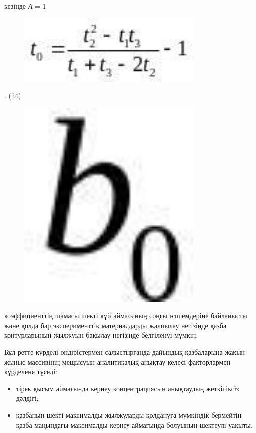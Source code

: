 кезінде \emph{А} = 1 \begin{figure}[H]
	\centering
	\includegraphics[width=0.8\textwidth]{assets/1310}
	\caption*{}
\end{figure}. (14)

\begin{figure}[H]
	\centering
	\includegraphics[width=0.8\textwidth]{assets/1304}
	\caption*{}
\end{figure} коэффициенттің шамасы шекті күй
аймағының соңғы өлшемдеріне байланысты және қолда бар эксперименттік
материалдарды жалпылау негізінде қазба контурларының жылжуын бақылау
негізінде белгіленуі мүмкін.

Бұл ретте күрделі өндірістермен салыстырғанда дайындық қазбаларына жақын
жыныс массивінің мещысуын аналитикалық анықтау келесі факторлармен
күрделене түседі:

\begin{itemize}
\item
  тірек қысым аймағында кернеу концентрациясын анықтаудың жеткіліксіз
  дәлдігі;
\item
  қазбаның шекті максималды жылжуларды қолдануға мүмкіндік бермейтін
  қазба маңындағы максималды кернеу аймағында болуының шектеулі уақыты.
\end{itemize}

